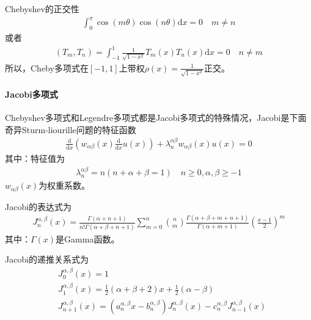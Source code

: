                 \par
                Chebyshev的正交性
                \begin{align*}
                \int _0^{\pi} \cos(m\theta) \cos(n\theta) \mathrm{d}x = 0 \quad m\neq n
                \end{align*}
                或者
                \begin{align*}
                    (T_m,T_n) = \int_{-1}^1 \frac{1}{\sqrt{1-x^2}} T_m(x) T_n(x) \mathrm{d}x = 0 \quad n\neq m
                \end{align*}
                所以，Cheby多项式在$[-1,1]$上带权$\rho (x) = \frac{1}{\sqrt{1-x^2}}$正交。

                \paragraph{Jacobi多项式}
                Chebyshev多项式和Legendre多项式都是Jacobi多项式的特殊情况，Jacobi是下面奇异Sturm-liourille问题的特征函数
                \begin{align*}
                    \frac{\mathrm{d}}{\mathrm{d}x}(w_{\alpha \beta}(x) \frac {\mathrm{d}}{\mathrm{d}x} u(x)) +
                    \lambda_n^{\alpha \beta } w_{\alpha \beta}(x) u(x) = 0
                \end{align*}
                其中：特征值为
                \begin{align*}
                    \lambda_n^{\alpha \beta } = n(n+\alpha +\beta =1) \quad n \geqslant 0,\alpha,\beta \geqslant -1
                \end{align*}
                $w_{\alpha \beta}(x)$为权重系数。
                \par
                Jacobi的表达式为
                \begin{align*}
                    J_n^{\alpha ,\beta} (x) = \frac{\Gamma(\alpha +n+1)}{n!\Gamma(\alpha +\beta+n+1)}
                    \sum_{m = 0}^n \binom{n}{m} \frac{\Gamma(\alpha +\beta+m+n+1)}{\Gamma(\alpha +m+1)}
                    \left( \frac{x-1}{2}\right)^m
                \end{align*}
                其中：$\Gamma(x)$是Gamma函数。
                \par
                Jacobi的递推关系式为
                \begin{align*}
                    &J_{0}^{\alpha ,\beta}(x) = 1\\
                    &J_{1}^{\alpha ,\beta}(x) = \frac{1}{2} (\alpha + \beta+2)x + \frac{1}{2}(\alpha - \beta)\\
                    &J_{n+1}^{\alpha ,\beta}(x) = (a_n^{\alpha ,\beta}x - b_n^{\alpha ,\beta})J_{n}^{\alpha ,\beta}(x)
                    - c_n^{\alpha ,\beta} J_{n-1}^{\alpha ,\beta}(x)
                \end{align*}
